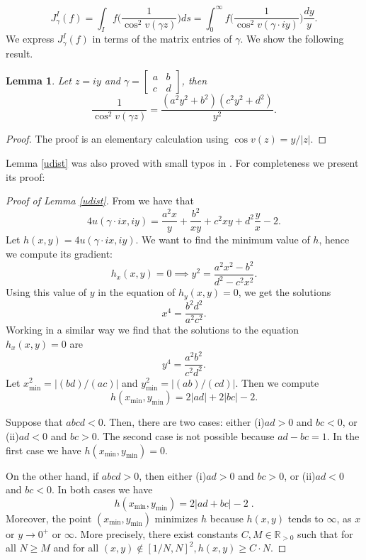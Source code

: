 \documentclass[a4paper,11pt]{amsart}
\newtheorem{lem}[theorem]{Lemma}
\theoremstyle{definition}
\begin{document}
$$J_{\gamma}^I(f)= \int_{I}f\Bigg(\frac{1}{\cos^2v(\gamma z)}\Bigg)ds = \int_{0}^{\infty}f\Bigg(\frac{1}{\cos^2v(\gamma \cdot iy)}\Bigg) \frac{dy}{y}.$$
We express $J_{\gamma}^I(f)$ in terms of the matrix entries of $\gamma$. We show the following result.
\begin{lem}\label{cosv}
Let $z=iy$ and $\gamma= \begin{bmatrix}
a & b \\
c & d
\end{bmatrix} $, then 
$$ \frac{1}{\cos ^2v(\gamma z)}= \frac{(a^2y^2+b^2)(c^2y^2+d^2)}{y^2}.$$

\end{lem}
\begin{proof}
The proof is an elementary calculation using $\cos v(z)=y/|z|$.

\end{proof}
Lemma \ref{udist} was also proved with small typos in \cite{MMW}. For completeness we present its proof:
\begin{proof}[Proof of Lemma \ref{udist}]
From \cite[p.~9, Eq.~9]{MMW} we have that 
$$4u(\gamma \cdot ix,iy)=\frac{a^2x}{y}+\frac{b^2}{xy}+c^2xy+d^2\frac{y}{x}-2.$$
Let $h(x,y)=4u(\gamma \cdot ix,iy)$. We want to find the minimum value of $h$, hence we compute its gradient:
\begin{equation}\label{h_x}
    h_x(x,y)=0 \implies y^2=\frac{a^2x^2-b^2}{d^2-c^2x^2}.
\end{equation}
Using this value of $y$ in the equation of $h_y(x,y)=0$, we get the solutions
$$x^4=\frac{b^2d^2}{a^2c^2}.$$
Working in a similar way we find that the solutions to the equation $h_x(x,y)=0$ are 
$$y^4=\frac{a^2b^2}{c^2d^2}.$$
Let $x_{\min}^2=|(bd)/(ac)|$ and $y_{\min}^2=|(ab)/(cd)|$. Then we compute
$$h(x_{\min},y_{\min})=2|ad|+2|bc|-2.$$

Suppose that $abcd<0$. Then, there are two cases: either (i)\:$ad>0$ and $bc<0$, or (ii)\:$ad<0$ and $bc>0$. The second case is not possible because $ad-bc=1$. In the first case we have $h(x_{\min},y_{\min})=0$.

On the other hand, if $abcd>0$, then either (i)\:$ad>0$ and $bc>0$, or (ii)\:$ad<0$ and $bc<0$. In both cases we have
$$h(x_{\min},y_{\min})=2|ad+bc|-2 \; .$$
Moreover, the point $(x_{\min},y_{\min})$ minimizes $h$ because $h(x,y)$ tends to $\infty$, as $x$ or $y\to 0^+$  or $\infty$. More precisely, there exist constants $C,M \in \mathbb{R}_{>0}$ such that for all $N\ge M$ and for all $(x,y)\notin[1/N,N]^2, h(x,y)\ge C\cdot N$.
\end{proof}
\end{document}

